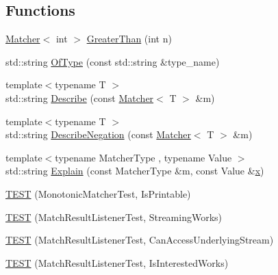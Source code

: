 \subsection*{Functions}
\begin{DoxyCompactItemize}
\item 
\mbox{\hyperlink{classtesting_1_1_matcher}{Matcher}}$<$ int $>$ \mbox{\hyperlink{namespacetesting_1_1gmock__matchers__test_a8cf8614a7c9adc8fb00e8af04895f97c}{Greater\+Than}} (int n)
\item 
std\+::string \mbox{\hyperlink{namespacetesting_1_1gmock__matchers__test_aea4c2446402f87073f8fec944fc1113c}{Of\+Type}} (const std\+::string \&type\+\_\+name)
\item 
{\footnotesize template$<$typename T $>$ }\\std\+::string \mbox{\hyperlink{namespacetesting_1_1gmock__matchers__test_a738a538e1705ea49670aeb3ed25108e6}{Describe}} (const \mbox{\hyperlink{classtesting_1_1_matcher}{Matcher}}$<$ T $>$ \&m)
\item 
{\footnotesize template$<$typename T $>$ }\\std\+::string \mbox{\hyperlink{namespacetesting_1_1gmock__matchers__test_a96c18b92dede79060a7303fe5d178faf}{Describe\+Negation}} (const \mbox{\hyperlink{classtesting_1_1_matcher}{Matcher}}$<$ T $>$ \&m)
\item 
{\footnotesize template$<$typename Matcher\+Type , typename Value $>$ }\\std\+::string \mbox{\hyperlink{namespacetesting_1_1gmock__matchers__test_a54e38d7df891801181af4c2acc38c3d5}{Explain}} (const Matcher\+Type \&m, const Value \&\mbox{\hyperlink{_obj__test_2lib_2googletest-master_2googlemock_2test_2gmock-matchers__test_8cc_a6150e0515f7202e2fb518f7206ed97dc}{x}})
\item 
\mbox{\hyperlink{namespacetesting_1_1gmock__matchers__test_a4bfc098c6e9ca2766a3dc8f149f62492}{T\+E\+ST}} (Monotonic\+Matcher\+Test, Is\+Printable)
\item 
\mbox{\hyperlink{namespacetesting_1_1gmock__matchers__test_a7bc21ec910c3861034d1336fecfcc260}{T\+E\+ST}} (Match\+Result\+Listener\+Test, Streaming\+Works)
\item 
\mbox{\hyperlink{namespacetesting_1_1gmock__matchers__test_abc02b215e80c57464c83abdf297b9db7}{T\+E\+ST}} (Match\+Result\+Listener\+Test, Can\+Access\+Underlying\+Stream)
\item 
\mbox{\hyperlink{namespacetesting_1_1gmock__matchers__test_ac7ee3826ca24c20fa2a8b388c72eedb2}{T\+E\+ST}} (Match\+Result\+Listener\+Test, Is\+Interested\+Works)

\end{DoxyCompactItemize}
